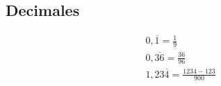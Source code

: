 \subsection{Decimales}
\begin{gather*} 
0,\overline{1} = \frac{1}{9}\\
0,\overline{36} = \frac{36}{96}\\
1,23\overline{4} = \frac{1234 -123}{900}\\
\end{gather*}